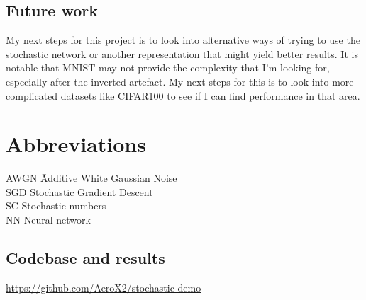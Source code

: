 \documentclass[a4paper,oneside,phd,etd]{BYUPhys}
\begin{document}
\section{Future work}
\label{sec:ConclustionsFuturework}
My next steps for this project is to look into alternative ways of trying to use the stochastic network or another representation that might yield better results.
It is notable that MNIST may not provide the complexity that I'm looking for, especially after the inverted artefact. My next steps for this is to look into more complicated datasets like CIFAR100 to see if I can find performance in that area.

\clearemptydoublepage
\chapter{Abbreviations}
\label{chap:abbreviations}

\begin{tabbing}

AWGN \qquad \qquad \= Additive White Gaussian Noise\\
SGD \> Stochastic Gradient Descent\\
SC \> Stochastic numbers\\
NN \> Neural network \\
\end{tabbing}


\appendix
\section{Codebase and results}
\url{https://github.com/AeroX2/stochastic-demo}

%

%

%
\end{document}

